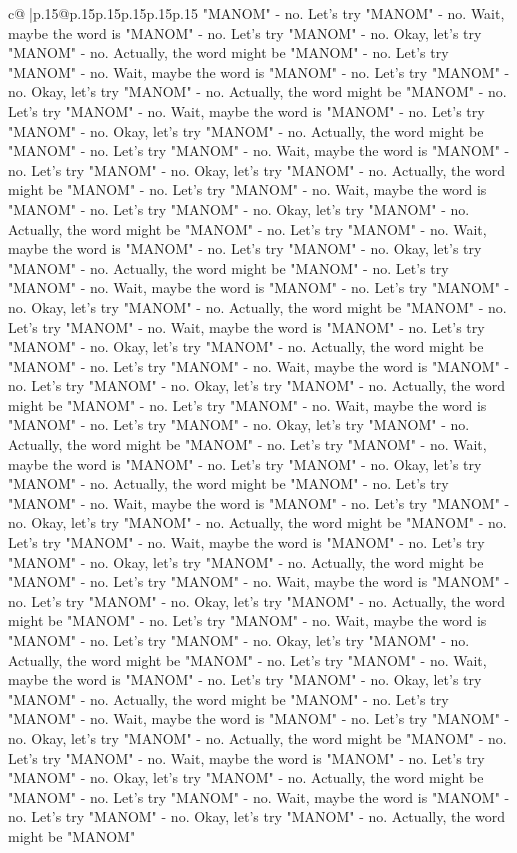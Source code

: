 \documentclass{article}
\begin{document}
{\begin{supertabular}{c@{$\;$}|p{.15\linewidth}@{}p{.15\linewidth}p{.15\linewidth}p{.15\linewidth}p{.15\linewidth}p{.15\linewidth}}
{{{"MANOM" {-} no. Let's try "MANOM" {-} no. Wait, maybe the word is "MANOM" {-} no. Let's try "MANOM" {-} no. Okay, let's try "MANOM" {-} no. Actually, the word might be "MANOM" {-} no. Let's try "MANOM" {-} no. Wait, maybe the word is "MANOM" {-} no. Let's try "MANOM" {-} no. Okay, let's try "MANOM" {-} no. Actually, the word might be "MANOM" {-} no. Let's try "MANOM" {-} no. Wait, maybe the word is "MANOM" {-} no. Let's try "MANOM" {-} no. Okay, let's try "MANOM" {-} no. Actually, the word might be "MANOM" {-} no. Let's try "MANOM" {-} no. Wait, maybe the word is "MANOM" {-} no. Let's try "MANOM" {-} no. Okay, let's try "MANOM" {-} no. Actually, the word might be "MANOM" {-} no. Let's try "MANOM" {-} no. Wait, maybe the word is "MANOM" {-} no. Let's try "MANOM" {-} no. Okay, let's try "MANOM" {-} no. Actually, the word might be "MANOM" {-} no. Let's try "MANOM" {-} no. Wait, maybe the word is "MANOM" {-} no. Let's try "MANOM" {-} no. Okay, let's try "MANOM" {-} no. Actually, the word might be "MANOM" {-} no. Let's try "MANOM" {-} no. Wait, maybe the word is "MANOM" {-} no. Let's try "MANOM" {-} no. Okay, let's try "MANOM" {-} no. Actually, the word might be "MANOM" {-} no. Let's try "MANOM" {-} no. Wait, maybe the word is "MANOM" {-} no. Let's try "MANOM" {-} no. Okay, let's try "MANOM" {-} no. Actually, the word might be "MANOM" {-} no. Let's try "MANOM" {-} no. Wait, maybe the word is "MANOM" {-} no. Let's try "MANOM" {-} no. Okay, let's try "MANOM" {-} no. Actually, the word might be "MANOM" {-} no. Let's try "MANOM" {-} no. Wait, maybe the word is "MANOM" {-} no. Let's try "MANOM" {-} no. Okay, let's try "MANOM" {-} no. Actually, the word might be "MANOM" {-} no. Let's try "MANOM" {-} no. Wait, maybe the word is "MANOM" {-} no. Let's try "MANOM" {-} no. Okay, let's try "MANOM" {-} no. Actually, the word might be "MANOM" {-} no. Let's try "MANOM" {-} no. Wait, maybe the word is "MANOM" {-} no. Let's try "MANOM" {-} no. Okay, let's try "MANOM" {-} no. Actually, the word might be "MANOM" {-} no. Let's try "MANOM" {-} no. Wait, maybe the word is "MANOM" {-} no. Let's try "MANOM" {-} no. Okay, let's try "MANOM" {-} no. Actually, the word might be "MANOM" {-} no. Let's try "MANOM" {-} no. Wait, maybe the word is "MANOM" {-} no. Let's try "MANOM" {-} no. Okay, let's try "MANOM" {-} no. Actually, the word might be "MANOM" {-} no. Let's try "MANOM" {-} no. Wait, maybe the word is "MANOM" {-} no. Let's try "MANOM" {-} no. Okay, let's try "MANOM" {-} no. Actually, the word might be "MANOM" {-} no. Let's try "MANOM" {-} no. Wait, maybe the word is "MANOM" {-} no. Let's try "MANOM" {-} no. Okay, let's try "MANOM" {-} no. Actually, the word might be "MANOM" {-} no. Let's try "MANOM" {-} no. Wait, maybe the word is "MANOM" {-} no. Let's try "MANOM" {-} no. Okay, let's try "MANOM" {-} no. Actually, the word might be "MANOM" {-} no. Let's try "MANOM" {-} no. Wait, maybe the word is "MANOM" {-} no. Let's try "MANOM" {-} no. Okay, let's try "MANOM" {-} no. Actually, the word might be "MANOM" {-} no. Let's try "MANOM" {-} no. Wait, maybe the word is "MANOM" {-} no. Let's try "MANOM" {-} no. Okay, let's try "MANOM" {-} no. Actually, the word might be "MANOM" }}}
\end{supertabular}}
\end{document}

